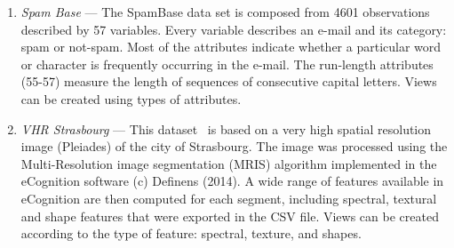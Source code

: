 \begin{enumerate}
	\item \textit{Spam Base} --- The SpamBase data set is composed from 4601 observations described by 57 variables. Every variable describes an e-mail and its category: spam or not-spam. Most of the attributes indicate whether a particular word or character is frequently occurring in the e-mail. The run-length attributes (55-57) measure the length of sequences of consecutive capital letters. Views can be created using types of attributes.\\
	\item \textit{VHR Strasbourg} --- This dataset~\cite{THRData} is based on a very high spatial resolution image (Pleiades) of the city of Strasbourg. The image was processed using the Multi-Resolution image segmentation (MRIS) algorithm implemented in the eCognition software (c) Definens (2014). A wide range of features available in eCognition are then computed for each segment, including spectral, textural and shape features that were exported in the CSV file. Views can be created according to the type of feature: spectral, texture, and shapes.
	\end{enumerate}

